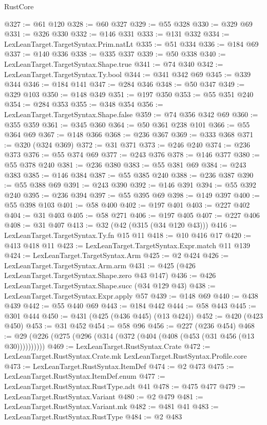 \begin{lexlean}{RustCore}
\begin{coremodule}
@327 := @61 @120
@328 := @60 @327
@329 := @55 @328
@330 := @329 @69
@331 := @326 @330
@332 := @146 @331
@333 := @131 @332
@334 := LexLeanTarget.TargetSyntax.Prim.natLt
@335 := @51 @334
@336 := @184 @69
@337 := @140 @336
@338 := @335 @337
@339 := @50 @338
@340 := LexLeanTarget.TargetSyntax.Shape.true
@341 := @74 @340
@342 := LexLeanTarget.TargetSyntax.Ty.bool
@344 := @341 @342 @69
@345 := @339 @344
@346 := @184 @141
@347 := @284 @346
@348 := @50 @347
@349 := @329 @103
@350 := @148 @349
@351 := @197 @350
@353 := @55 @351 @240
@354 := @284 @353
@355 := @348 @354
@356 := LexLeanTarget.TargetSyntax.Shape.false
@359 := @74 @356 @342 @69
@360 := @355 @359
@361 := @345 @360
@364 := @50 @361 @238 @101
@366 := @55 @364 @69
@367 := @148 @366
@368 := @236 @367
@369 := @333 @368
@371 := @320 (@324 @369)
@372 := @31 @371
@373 := @246 @240
@374 := @236 @373
@376 := @55 @374 @69
@377 := @243 @376
@378 := @146 @377
@380 := @55 @378 @240
@381 := @236 @380
@383 := @55 @381 @69
@384 := @243 @383
@385 := @146 @384
@387 := @55 @385 @240
@388 := @236 @387
@390 := @55 @388 @69
@391 := @243 @390
@392 := @146 @391
@394 := @55 @392 @240
@395 := @236 @394
@397 := @55 @395 @69
@398 := @149 @397
@400 := @55 @398 @103
@401 := @58 @400
@402 := @197 @401
@403 := @227 @402
@404 := @31 @403
@405 := @58 @271
@406 := @197 @405
@407 := @227 @406
@408 := @31 @407
@413 := @32 (@42 (@315 (@34 @120 @43)))
@416 := LexLeanTarget.TargetSyntax.Ty.fn @15 @11
@418 := @10 @416 @17
@420 := @413 @418 @11
@423 := LexLeanTarget.TargetSyntax.Expr.match @11 @139
@424 := LexLeanTarget.TargetSyntax.Arm
@425 := @2 @424
@426 := LexLeanTarget.TargetSyntax.Arm.arm
@431 := @425 (@426 LexLeanTarget.TargetSyntax.Shape.zero @43 @147)
@436 := @426 LexLeanTarget.TargetSyntax.Shape.succ (@34 @129 @43)
@438 := LexLeanTarget.TargetSyntax.Expr.apply @57
@439 := @148 @69
@440 := @438 @439
@442 := @55 @440 @69
@443 := @184 @442
@444 := @58 @443
@445 := @301 @444
@450 := @431 (@425 (@436 @445) (@13 @424))
@452 := @420 (@423 @450)
@453 := @31 @452
@454 := @58 @96
@456 := @227 (@236 @454)
@468 := @29 (@226 (@275 (@296 (@314 (@372 (@404 (@408 (@453 (@31 @456 (@13 @30))))))))))
@469 := LexLeanTarget.RustSyntax.Crate
@472 := LexLeanTarget.RustSyntax.Crate.mk LexLeanTarget.RustSyntax.Profile.core
@473 := LexLeanTarget.RustSyntax.ItemDef
@474 := @2 @473
@475 := LexLeanTarget.RustSyntax.ItemDef.enum
@477 := LexLeanTarget.RustSyntax.RustType.adt @41
@478 := @475 @477
@479 := LexLeanTarget.RustSyntax.Variant
@480 := @2 @479
@481 := LexLeanTarget.RustSyntax.Variant.mk
@482 := @481 @41
@483 := LexLeanTarget.RustSyntax.RustType
@484 := @2 @483

\end{coremodule}
\end{lexlean}
